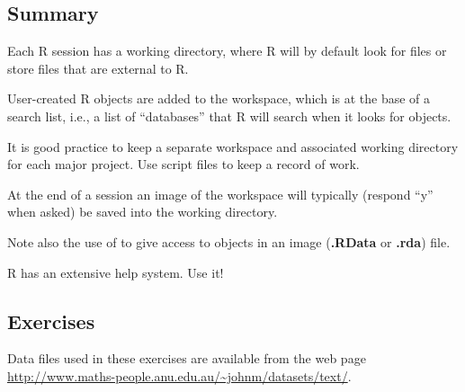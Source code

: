 \subsection{Summary}
\begin{itemizz}
\item[] Each R session has a working directory, where R will by
  default look for files or store files that are external to R.
\item[]
User-created R objects are added to the workspace, which is
at the base of a search list, i.e., a list of ``databases'' that R
will search when it looks for objects.
\item[] It is good practice to keep a separate workspace and
  associated working directory for each major project.  Use script
  files to keep a record of work.  
\item[] At the end of a session an image of the workspace will
  typically (respond ``y'' when asked) be saved into the working
  directory.
\item[] Note also the use of  to give access to objects
  in an image (\textbf{.RData} or \textbf{.rda})
  file.
\item[] R has an extensive help system.  Use it!
\end{itemizz}

\subsection{Exercises}\label{ss:wd}
Data files used in these exercises are available from the web
page  \url{http://www.maths-people.anu.edu.au/~johnm/datasets/text/}.

